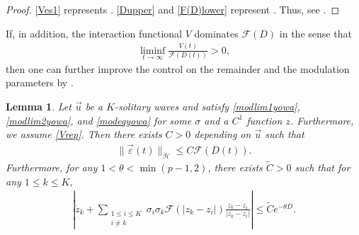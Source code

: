 \documentclass[reqno]{amsart}
\theoremstyle{plain}
\newtheorem{lemma}[theorem]{Lemma}
\theoremstyle{definition}
\numberwithin{equation}{section}
\newcommand{\1}{\mathbbm{1}}
\begin{document}
\begin{proof}
\eqref{Ves1} represents \cite[Lemma 3.8]{I2}. \eqref{Dupper} and \eqref{F(D)lower} represent \cite[Lemma 3.9]{I2}. Thus, see \cite[Lemma 3.8, Lemma 3.9]{I2}.
\end{proof}
If, in addition, the interaction functional $V$ dominates $\mathcal{F}(D)$ in the sense that
\begin{align}\label{Vrep}
\liminf_{t\to \infty}\frac{V(t)}{\mathcal{F}(D(t))}> 0,
\end{align}
then one can further improve the control on the remainder and the modulation parameters by \cite[Lemma 3.11]{I2}.
\begin{lemma}\label{epzes}
Let $\vec{u}$ be a $K$-solitary waves and satisfy \eqref{modlim1yowa}, \eqref{modlim2yowa}, and \eqref{modeqyowa} for some $\sigma$ and a $C^1$ function $z$. Furthermore, we assume \eqref{Vrep}. Then there exists $C>0$ depending on $\vec{u}$ such that
\begin{align}\label{newepes}
\|\vec{\varepsilon}(t)\|_{\mathcal{H}}\leq C \mathcal{F}(D(t)).
\end{align}
Furthermore, for any $1<\theta<\min{(p-1,2)}$, there exists $\tilde{C}>0$ such that for any $1\leq k\leq K$,
\begin{align}\label{newzes}
\left|\dot{z}_k+\sum_{\substack{1\leq i\leq K\\ i\neq k}}\sigma_i\sigma_k\mathcal{F}(|z_k-z_i|)
\frac{z_k-z_i}{|z_k-z_i|}\right|
\leq \tilde{C} e^{-\theta D}.
\end{align}
\end{lemma}
\end{document}
